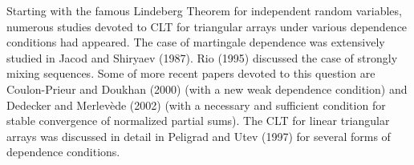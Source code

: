 \documentclass[10pt]{article}
\def\N{\mathbb{N}}
\begin{document}
Starting with the famous Lindeberg Theorem for independent random variables,
numerous studies devoted to
CLT for triangular arrays under various dependence conditions had appeared.
The case of martingale dependence was extensively studied in
Jacod and Shiryaev (1987).
Rio (1995) discussed the case of strongly mixing sequences.
Some of more recent papers devoted to this question are Coulon-Prieur and Doukhan (2000)
(with a new weak dependence condition) and Dedecker and Merlev\`ede (2002) (with a necessary and sufficient condition for stable convergence of  normalized partial sums). The CLT for linear triangular arrays %
was discussed in detail in Peligrad and Utev (1997) for several forms of dependence conditions.
~\\
\end{document}
